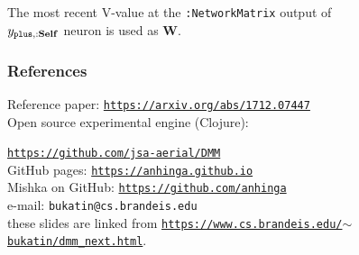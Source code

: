 \documentclass{beamer}
\newcommand{\msblue}[1]{{\color{myblue} #1}}
\begin{document}
\begin{frame}

The most recent V-value at the {\footnotesize\tt :NetworkMatrix} output of\\ $y_{{\tt plus}, {\bf :Self}}$ neuron is used as \msblue{\bf W}.


\end{frame}



\begin{frame}

  \frametitle{References}

Reference paper: \href{https://arxiv.org/abs/1712.07447}{\tt\footnotesize  https://arxiv.org/abs/1712.07447}\\[2ex]

Open source experimental engine (Clojure):

\href{https://github.com/jsa-aerial/DMM}{\tt\footnotesize https://github.com/jsa-aerial/DMM}\\[2ex]

GitHub pages: \href{https://anhinga.github.io}{\tt\footnotesize  https://anhinga.github.io}\\[2ex]

Mishka on GitHub: \href{https://github.com/anhinga}{\tt\footnotesize https://github.com/anhinga}\\[2ex]

e-mail: {\tt\footnotesize bukatin@cs.brandeis.edu}\\[2ex]

these slides are linked from \href{https://www.cs.brandeis.edu/~bukatin/dmm\_next.html}{\tt\footnotesize https://www.cs.brandeis.edu/$\sim$bukatin/dmm\_next.html}.


\end{frame}
\end{document}
